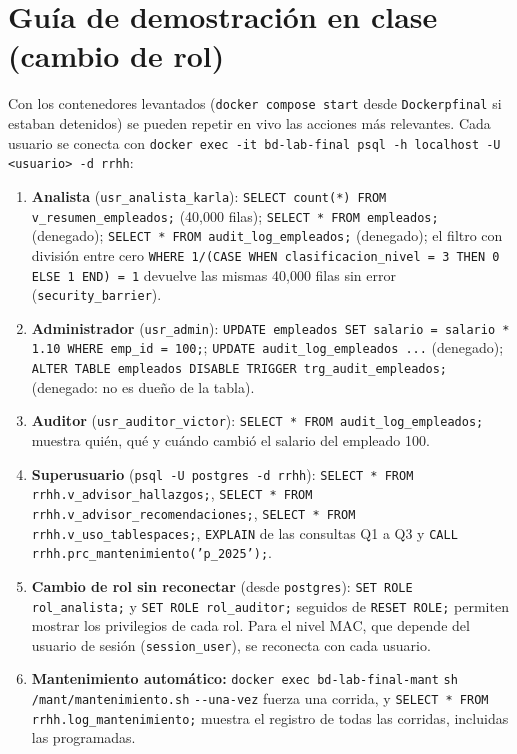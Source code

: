 \documentclass[12pt,a4paper]{article}
\begin{document}
\section{Guía de demostración en clase (cambio de rol)}
\label{sec:demo}

Con los contenedores levantados (\texttt{docker compose start} desde \texttt{Dockerpfinal} si estaban detenidos) se pueden repetir en vivo las acciones más relevantes. Cada usuario se conecta con \texttt{docker exec -it bd-lab-final psql -h localhost -U <usuario> -d rrhh}:

\begin{enumerate}
    \item \textbf{Analista} (\texttt{usr\_\allowbreak{}analista\_\allowbreak{}karla}): \texttt{SELECT count(*) FROM v\_\allowbreak{}resumen\_\allowbreak{}empleados;} (40,000 filas); \texttt{SELECT * FROM empleados;} (denegado); \texttt{SELECT * FROM audit\_\allowbreak{}log\_\allowbreak{}empleados;} (denegado); el filtro con división entre cero \texttt{WHERE 1/(CASE WHEN clasificacion\_\allowbreak{}nivel = 3 THEN 0 ELSE 1 END) = 1} devuelve las mismas 40,000 filas sin error (\texttt{security\_\allowbreak{}barrier}).
    \item \textbf{Administrador} (\texttt{usr\_\allowbreak{}admin}): \texttt{UPDATE empleados SET salario = salario * 1.10 WHERE emp\_\allowbreak{}id = 100;}; \texttt{UPDATE audit\_\allowbreak{}log\_\allowbreak{}empleados ...} (denegado); \texttt{ALTER TABLE empleados DISABLE TRIGGER trg\_\allowbreak{}audit\_\allowbreak{}empleados;} (denegado: no es dueño de la tabla).
    \item \textbf{Auditor} (\texttt{usr\_\allowbreak{}auditor\_\allowbreak{}victor}): \texttt{SELECT * FROM audit\_\allowbreak{}log\_\allowbreak{}empleados;} muestra quién, qué y cuándo cambió el salario del empleado 100.
    \item \textbf{Superusuario} (\texttt{psql -U postgres -d rrhh}): \texttt{SELECT * FROM rrhh.v\_\allowbreak{}advisor\_\allowbreak{}hallazgos;}, \texttt{SELECT * FROM rrhh.v\_\allowbreak{}advisor\_\allowbreak{}recomendaciones;}, \texttt{SELECT * FROM rrhh.v\_\allowbreak{}uso\_\allowbreak{}tablespaces;}, \texttt{EXPLAIN} de las consultas Q1 a Q3 y \texttt{CALL rrhh.prc\_\allowbreak{}mantenimiento('p\_\allowbreak{}2025');}.
    \item \textbf{Cambio de rol sin reconectar} (desde \texttt{postgres}): \texttt{SET ROLE rol\_\allowbreak{}analista;} y \texttt{SET ROLE rol\_\allowbreak{}auditor;} seguidos de \texttt{RESET ROLE;} permiten mostrar los privilegios de cada rol. Para el nivel MAC, que depende del usuario de sesión (\texttt{session\_\allowbreak{}user}), se reconecta con cada usuario.
    \item \textbf{Mantenimiento automático:} \texttt{docker exec bd-lab-final-mant} \texttt{sh /mant/\allowbreak{}mantenimiento.sh} \texttt{-{}-una-vez} fuerza una corrida, y \texttt{SELECT * FROM rrhh.log\_\allowbreak{}mantenimiento;} muestra el registro de todas las corridas, incluidas las programadas.
\end{enumerate}
\end{document}
